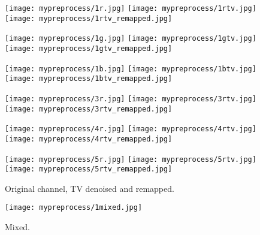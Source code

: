 \begin{figure}[!h]
	\centering
	\subfigure
	{
		\texttt{[image: mypreprocess/1r.jpg]}
		\label{fig:1r}
	}
	\subfigure
	{
		\texttt{[image: mypreprocess/1rtv.jpg]}
		\label{fig:1rtv}
	}
	\subfigure
	{
		\texttt{[image: mypreprocess/1rtv\_remapped.jpg]}
		\label{fig:1rremap}
	}

	\subfigure
	{
		\texttt{[image: mypreprocess/1g.jpg]}
		\label{fig:1gg}
	}
	\subfigure
	{
		\texttt{[image: mypreprocess/1gtv.jpg]}
		\label{fig:1gtv}
	}
	\subfigure
	{
		\texttt{[image: mypreprocess/1gtv\_remapped.jpg]}
		\label{fig:1gremap}
	}
	
	\subfigure
	{
		\texttt{[image: mypreprocess/1b.jpg]}
		\label{fig:1b}
	}
	\subfigure
	{
		\texttt{[image: mypreprocess/1btv.jpg]}
		\label{fig:1btv}
	}
	\subfigure
	{
		\texttt{[image: mypreprocess/1btv\_remapped.jpg]}
		\label{fig:1bremap}
	}
	
	\subfigure	
	{
		\texttt{[image: mypreprocess/3r.jpg]}
		\label{fig:3r}
	}
	\subfigure
	{
		\texttt{[image: mypreprocess/3rtv.jpg]}
		\label{fig:3rtv}
	}
	\subfigure
	{
		\texttt{[image: mypreprocess/3rtv\_remapped.jpg]}
		\label{fig:3rremap}
	}

	\subfigure	
	{
		\texttt{[image: mypreprocess/4r.jpg]}
		\label{fig:4r}
	}
	\subfigure
	{
		\texttt{[image: mypreprocess/4rtv.jpg]}
		\label{fig:4rtv}
	}
	\subfigure
	{
		\texttt{[image: mypreprocess/4rtv\_remapped.jpg]}
		\label{fig:4rremap}
	}

	\subfigure	
	{
		\texttt{[image: mypreprocess/5r.jpg]}
		\label{fig:5r}
	}
	\subfigure
	{
		\texttt{[image: mypreprocess/5rtv.jpg]}
		\label{fig:5rtv}
	}
	\subfigure
	{
		\texttt{[image: mypreprocess/5rtv\_remapped.jpg]}
		\label{fig:5rremap}
	}
	
	\caption{Original channel, TV denoised and remapped.}
	\label{fig:original_tv_remap}
\end{figure}

\begin{figure}[!h]
	\centering
	\texttt{[image: mypreprocess/1mixed.jpg]}
	\caption{Mixed.}
	\label{fig:mixed}
\end{figure}

